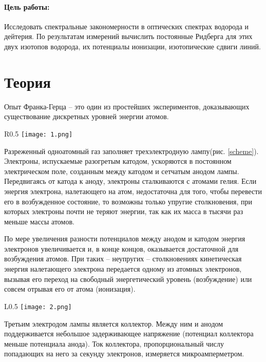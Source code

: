 \documentclass{physlab}
\begin{document}


\paragraph{Цель работы:} Исследовать спектральные закономерности в оптических спектрах водорода и дейтерия. По результатам измерений вычислить постоянные Ридберга для этих двух изотопов водорода, их потенциалы ионизации, изотопические сдвиги линий.

\section{Теория}
Опыт Франка-Герца -- это один из простейших экспериментов, доказывающих существование дискретных уровней энергии атомов.

\begin{wrapfigure}{R}{0.5\linewidth}
\centering
    \texttt{[image: 1.png]}
\caption{Принципиальная схема опыта}
\label{scheme} 
\end{wrapfigure}

Разреженный одноатомный газ заполняет трехэлектродную лампу(рис. \ref{scheme}).  Электроны, испускаемые разогретым катодом, ускоряются в постоянном электрическом поле, созданным между катодом и сетчатым анодом лампы. Передвигаясь от катода к аноду, электроны сталкиваются с атомами гелия. Если энергия электрона, налетающего на атом, недостаточна для того, чтобы перевести его в возбужденное состояние, то возможны только упругие столкновения, при которых электроны почти не теряют энергии, так как их масса в тысячи раз меньше массы атомов. 


По мере увеличения разности потенциалов между анодом и катодом энергия электронов увеличивается и, в конце концов, оказывается достаточной для возбуждения атомов. При таких -- неупругих -- столкновениях кинетическая энергия налетающего электрона передается одному из атомных электронов, вызывая его переход на свободный энергетический уровень (возбуждение) или совсем отрывая его от атома (ионизация).

\begin{wrapfigure}[12]{L}{0.5\linewidth} 
\centering
    \texttt{[image: 2.png]}
\caption{Зависимость тока коллектора от напряжения на аноде}
\label{dependency}
\end{wrapfigure}

Третьим электродом лампы является коллектор. Между ним и анодом поддерживается небольшое задерживающее напряжение (потенциал коллектора меньше потенциала анода). Ток коллектора, пропорциональный числу попадающих на него за секунду электронов, измеряется микроамперметром.
\end{document}
